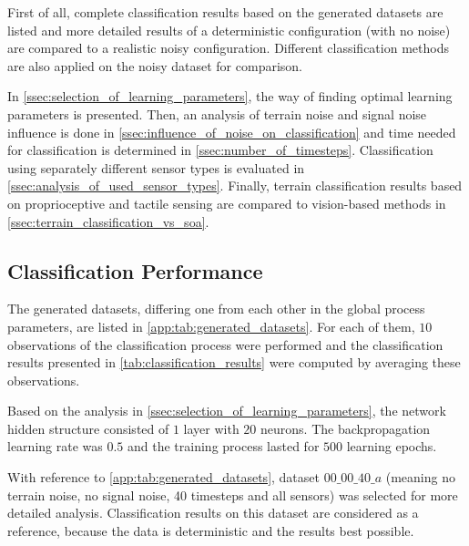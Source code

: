 First of all, complete classification results based on the generated datasets are listed and more detailed results of a deterministic configuration (with no noise) are  compared to a realistic noisy configuration. Different classification methods are also applied on the noisy dataset for comparison.

In \cref{ssec:selection_of_learning_parameters}, the way of finding optimal learning parameters is presented. Then, an analysis of terrain noise and signal noise influence is done in \cref{ssec:influence_of_noise_on_classification} and time needed for classification is determined in \cref{ssec:number_of_timesteps}. Classification using separately different sensor types is evaluated in \cref{ssec:analysis_of_used_sensor_types}. Finally, terrain classification results based on proprioceptive and tactile sensing are compared to vision-based methods in \cref{ssec:terrain_classification_vs_soa}.

\subsection{Classification Performance} \label{ssec:classification_performance}
The generated datasets, differing one from each other in the global process parameters, are listed in \cref{app:tab:generated_datasets}. For each of them, $ 10 $ observations of the classification process were performed and the classification results presented in \cref{tab:classification_results} were computed by averaging these observations.

Based on the analysis in \cref{ssec:selection_of_learning_parameters}, the network hidden structure consisted of $ 1 $ layer with $ 20 $ neurons. The backpropagation learning rate was $ 0.5 $ and the training process lasted for $ 500 $ learning epochs.

With reference to \cref{app:tab:generated_datasets}, dataset $ 00\_00\_40\_a $ (meaning no terrain noise, no signal noise, 40 timesteps and all sensors) was selected for more detailed analysis. Classification results on this dataset are considered as a reference, because the data is deterministic and the results best possible.

